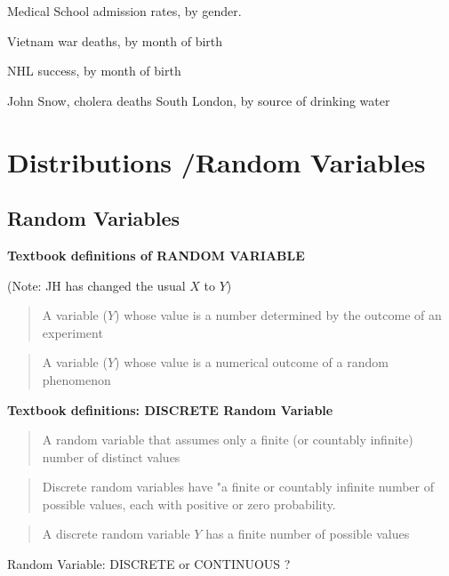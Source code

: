 \documentclass[]{book}
\begin{document}
Medical School admission rates, by gender.

Vietnam war deaths, by month of birth

NHL success, by month of birth

John Snow, cholera deaths South London, by source of drinking water

\hypertarget{Distributions}{%
\chapter{Distributions /Random Variables}\label{Distributions}}

\hypertarget{random-variables}{%
\section{Random Variables}\label{random-variables}}

\textbf{Textbook definitions of RANDOM VARIABLE}

(Note: JH has changed the usual \(X\) to \(Y\))

\begin{quote}
A variable (\(Y\)) whose value is a number determined by the outcome of an experiment
\end{quote}

\begin{quote}
A variable (\(Y\)) whose value is a numerical outcome of a random phenomenon
\end{quote}

\textbf{Textbook definitions: DISCRETE Random Variable}

\begin{quote}
A random variable that assumes only a finite (or countably infinite) number of distinct values
\end{quote}

\begin{quote}
Discrete random variables have "a finite or countably infinite number of possible values, each with positive or zero probability.
\end{quote}

\begin{quote}
A discrete random variable \(Y\) has a finite number of possible values
\end{quote}

Random Variable: DISCRETE or CONTINUOUS ?
\end{document}
